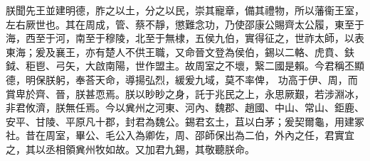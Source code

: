 \begin{pinyinscope}
朕聞先王並建明德，胙之以土，分之以民，崇其寵章，備其禮物，所以藩衞王室，左右厥世也。其在周成，管、蔡不靜，懲難念功，乃使邵康公賜齊太公履，東至于海，西至于河，南至于穆陵，北至于無棣，五侯九伯，實得征之，世祚太師，以表東海；爰及襄王，亦有楚人不供王職，又命晉文登為侯伯，錫以二輅、虎賁、鈇鉞、秬鬯、弓矢，大啟南陽，世作盟主。故周室之不壞，繄二國是賴。今君稱丕顯德，明保朕躬，奉荅天命，導揚弘烈，緩爰九域，莫不率俾，
功高于伊、周，而賞卑於齊、晉，朕甚恧焉。朕以眇眇之身，託于兆民之上，永思厥艱，若涉淵冰，非君攸濟，朕無任焉。今以兾州之河東、河內、魏郡、趙國、中山、常山、鉅鹿、安平、甘陵、平原凡十郡，封君為魏公。錫君玄土，苴以白茅；爰契爾龜，用建冢社。昔在周室，畢公、毛公入為卿佐，周、邵師保出為二伯，外內之任，君實宜之，其以丞相領兾州牧如故。又加君九錫，其敬聽朕命。



\end{pinyinscope}

